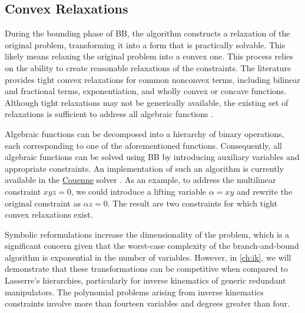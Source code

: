 \subsection{Convex Relaxations}
During the bounding phase of BB, the algorithm constructs a relaxation of the original problem, transforming it into a form that is practically solvable. This likely means relaxing the original problem into a convex one. This process relies on the ability to create reasonable relaxations of the constraints. The literature provides tight convex relaxations for common nonconvex terms, including bilinear and fractional terms, exponentiation, and wholly convex or concave functions. Although tight relaxations may not be generically available, the existing set of relaxations is sufficient to address all algebraic functions \cite{SMITH1999}.

Algebraic functions can be decomposed into a hierarchy of binary operations, each corresponding to one of the aforementioned functions. Consequently, all algebraic functions can be solved using BB by introducing auxiliary variables and appropriate constraints. An implementation of such an algorithm is currently available in the \href{https://github.com/coin-or/Couenne}{Couenne} solver \cite{CoinOr}. As an example, to address the multilinear constraint $xyz=0$, we could introduce a lifting variable $\alpha=xy$ and rewrite the original constraint as $\alpha z=0$. The result are two constraints for which tight convex relaxations exist.

Symbolic reformulations increase the dimensionality of the problem, which is a significant concern given that the worst-case complexity of the branch-and-bound algorithm is exponential in the number of variables. However, in \cref{ch:ik}, we will demonstrate that these transformations can be competitive when compared to Lasserre's hierarchies, particularly for inverse kinematics of generic redundant manipulators. The polynomial problems arising from inverse kinematics constraints  involve more than fourteen variables and degrees greater than four.

